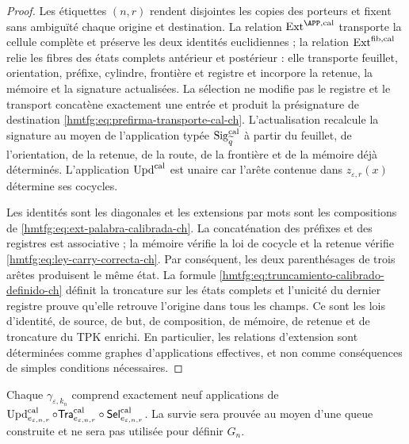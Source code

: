 \begin{proof}
Les étiquettes \((n,r)\) rendent disjointes les copies des porteurs et fixent
sans ambiguïté chaque origine et destination. La relation
\(\operatorname{Ext}^{\APP,\rm cal}\) transporte la cellule complète et
préserve les deux identités euclidiennes ; la relation
\(\operatorname{Ext}^{\rm fib,cal}\) relie les fibres des états
complets antérieur et postérieur : elle transporte feuillet, orientation, préfixe,
cylindre, frontière et registre et incorpore la retenue, la mémoire et la signature
actualisées. La sélection ne modifie pas le registre et le transport concatène
exactement une entrée et produit la présignature de destination
\eqref{hmtfg:eq:prefirma-transporte-cal-ch}. L’actualisation recalcule la signature au moyen de
l’application typée \(\operatorname{Sig}^{\rm cal}_{\widetilde q}\) à partir du
feuillet, de l’orientation, de la retenue, de la route, de la frontière et de la mémoire déjà déterminés. L’application
\(\operatorname{Upd}^{\rm cal}\) est unaire car l’arête contenue dans
\(z_{\varepsilon,r}(x)\) détermine ses cocycles.

Les identités sont les diagonales et les extensions par mots sont les
compositions de \eqref{hmtfg:eq:ext-palabra-calibrada-ch}. La concaténation des
préfixes et des registres est associative ; la mémoire vérifie la loi de cocycle et
la retenue vérifie
\eqref{hmtfg:eq:ley-carry-correcta-ch}. Par conséquent, les deux parenthésages de trois
arêtes produisent le même état. La formule
\eqref{hmtfg:eq:truncamiento-calibrado-definido-ch} définit la troncature sur
les états complets et l’unicité du dernier registre prouve qu’elle retrouve
l’origine dans tous les champs. Ce sont les lois d’identité, de source,
de but, de composition, de mémoire, de retenue et de troncature du TPK enrichi.
En particulier, les relations d’extension sont déterminées comme graphes
d’applications effectives, et non comme conséquences de simples conditions
nécessaires.
\end{proof}

Chaque \(\gamma_{\varepsilon,k_n}\) comprend exactement neuf applications de \(\operatorname{Upd}^{\rm cal}_{e_{\varepsilon,n,r}}\circ
\mathsf{Tra}^{\rm cal}_{e_{\varepsilon,n,r}}\circ
\mathsf{Sel}^{\rm cal}_{e_{\varepsilon,n,r}}\). La survie sera prouvée au moyen d'une queue construite et ne sera pas utilisée pour définir \(G_n\).

